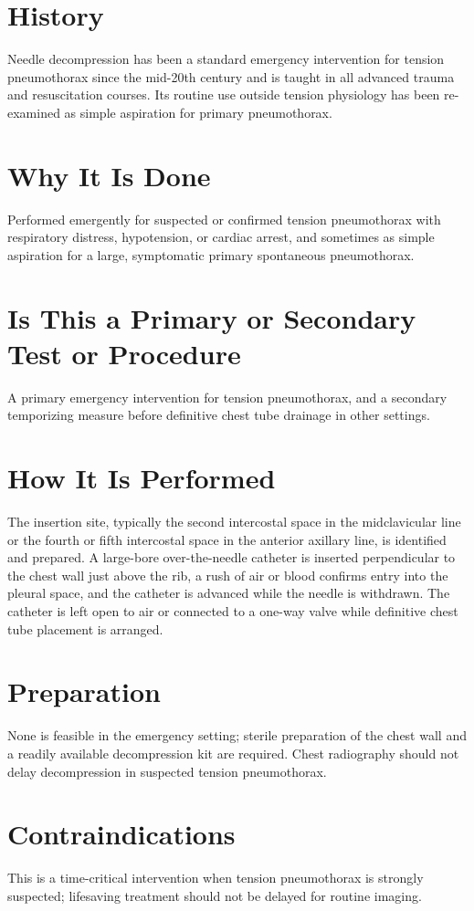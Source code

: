\section*{History}
Needle decompression has been a standard emergency intervention for tension pneumothorax since the mid-20th century and is taught in all advanced trauma and resuscitation courses. Its routine use outside tension physiology has been re-examined as simple aspiration for primary pneumothorax.

\section*{Why It Is Done}
Performed emergently for suspected or confirmed tension pneumothorax with respiratory distress, hypotension, or cardiac arrest, and sometimes as simple aspiration for a large, symptomatic primary spontaneous pneumothorax.

\section*{Is This a Primary or Secondary Test or Procedure}
A primary emergency intervention for tension pneumothorax, and a secondary temporizing measure before definitive chest tube drainage in other settings.

\section*{How It Is Performed}
The insertion site, typically the second intercostal space in the midclavicular line or the fourth or fifth intercostal space in the anterior axillary line, is identified and prepared. A large-bore over-the-needle catheter is inserted perpendicular to the chest wall just above the rib, a rush of air or blood confirms entry into the pleural space, and the catheter is advanced while the needle is withdrawn. The catheter is left open to air or connected to a one-way valve while definitive chest tube placement is arranged.

\section*{Preparation}
None is feasible in the emergency setting; sterile preparation of the chest wall and a readily available decompression kit are required. Chest radiography should not delay decompression in suspected tension pneumothorax.

\section*{Contraindications}
This is a time-critical intervention when tension pneumothorax is strongly suspected; lifesaving treatment should not be delayed for routine imaging.


